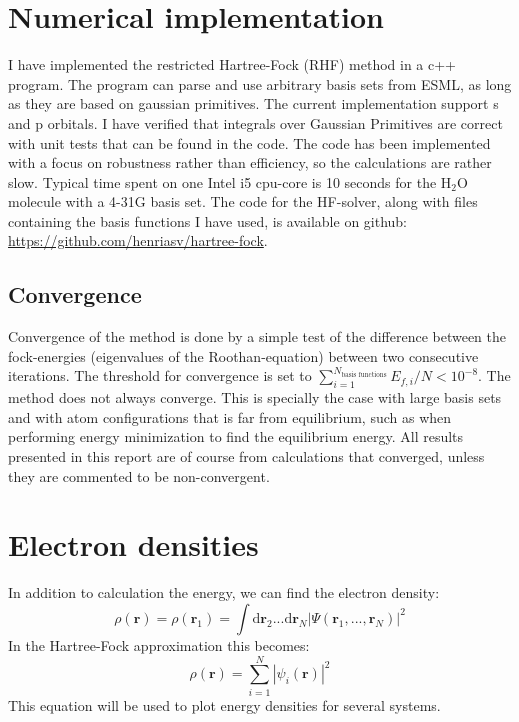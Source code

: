 \documentclass[a4paper,10pt, twocolumn, pre]{revtex4}
\newcommand{\rvec}{\mathbf{r}}
\newcommand{\dd}{\mathrm{d}}
\begin{document}
\section{Numerical implementation}
I have implemented the restricted Hartree-Fock (RHF) method in a c++ program. The program can parse and use arbitrary basis sets from ESML, as long as they are based on gaussian primitives. The current implementation support s and p orbitals. I have verified that integrals over Gaussian Primitives are correct with unit tests that can be found in the code. The code has been implemented with a focus on robustness rather than efficiency, so the calculations are rather slow. Typical time spent on one Intel i5 cpu-core is 10 seconds for the H$_2$O molecule with a 4-31G basis set. The code for the HF-solver, along with files containing the basis functions I have used, is available on github: \url{https://github.com/henriasv/hartree-fock}.

\subsection{Convergence}
Convergence of the method is done by a simple test of the difference between the fock-energies (eigenvalues of the Roothan-equation) between two consecutive iterations. The threshold for convergence is set to $\sum_{i=1}^{N_{\text{basis functions}}} E_{f, i}/N < 10^{-8}$. The method does not always converge. This is specially the case with large basis sets and with atom configurations that is far from equilibrium, such as when performing energy minimization to find the equilibrium energy. All results presented in this report are of course from calculations that converged, unless they are commented to be non-convergent.

\section{Electron densities}
In addition to calculation the energy, we can find the electron density:
\begin{equation}
	\rho(\rvec) = \rho(\rvec_1) = \int \dd \rvec_2 ... \dd \rvec_N |\Psi(\rvec_1, ..., \rvec_N)|^2
\end{equation}
In the Hartree-Fock approximation this becomes:
\begin{equation}
	\rho(\rvec) = \sum_{i=1}^{N}|\psi_i(\rvec)|^2
\end{equation}
This equation will be used to plot energy densities for several systems. 
\end{document}

